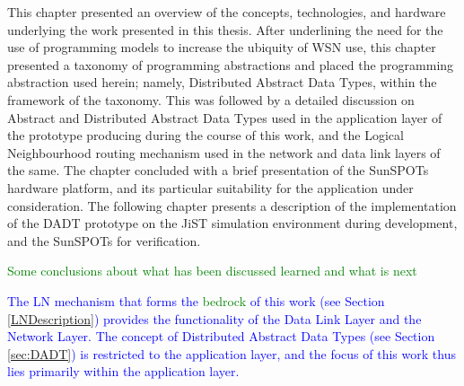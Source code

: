 This chapter presented an overview of the concepts, technologies, and hardware underlying the work presented in this thesis. After underlining the need for the use of programming models to increase the ubiquity of WSN use, this chapter presented a taxonomy of programming abstractions and placed the programming abstraction used herein; namely, Distributed Abstract Data Types, within the framework of the taxonomy. This was followed by a detailed discussion on Abstract and Distributed Abstract Data Types used in the application layer of the prototype producing during the course of this work, and the Logical Neighbourhood routing mechanism used in the network and data link layers of the same. The chapter concluded with a brief presentation of the SunSPOTs hardware platform, and its particular suitability for the application under consideration. The following chapter presents a description of the implementation of the DADT prototype on the JiST simulation environment during development, and the SunSPOTs for verification.

\textcolor{green}{Some conclusions about what has been discussed learned and
what is next}


\textcolor{blue}{The LN mechanism that forms the \textcolor{green}{bedrock} of this work (see Section \ref{LNDescription}) provides the functionality of the Data Link Layer and the Network Layer. The concept of Distributed Abstract
Data Types (see Section \ref{sec:DADT}) is restricted to the application layer, and the focus of this work thus lies primarily within the application layer.}

  